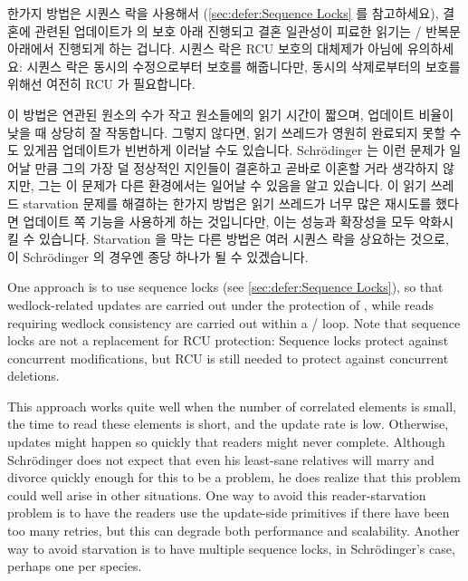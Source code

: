 \fi

한가지 방법은 시퀀스 락을 사용해서
(\cref{sec:defer:Sequence Locks} 를 참고하세요),
결혼에 관련된 업데이트가  의 보호 아래 진행되고 결혼
일관성이 피료한 읽기는  /  반복문
아래에서 진행되게 하는 겁니다.
시퀀스 락은 RCU 보호의 대체제가 아님에 유의하세요:
시퀀스 락은 동시의 수정으로부터 보호를 해줍니다만, 동시의 삭제로부터의 보호를
위해선 여전히 RCU 가 필요합니다.

이 방법은 연관된 원소의 수가 작고 원소들에의 읽기 시간이 짧으며, 업데이트
비율이 낮을 때 상당히 잘 작동합니다.
그렇지 않다면, 읽기 쓰레드가 영원히 완료되지 못할 수도 있게끔 업데이트가
빈번하게 이러날 수도 있습니다.
Schr\"odinger 는 이런 문제가 일어날 만큼 그의 가장 덜 정상적인 지인들이
결혼하고 곧바로 이혼할 거라 생각하지 않지만, 그는 이 문제가 다른 환경에서는
일어날 수 있음을 알고 있습니다.
이 읽기 쓰레드 starvation 문제를 해결하는 한가지 방법은 읽기 쓰레드가 너무 많은
재시도를 했다면 업데이트 쪽 기능을 사용하게 하는 것입니다만, 이는 성능과
확장성을 모두 악화시킬 수 있습니다.
Starvation 을 막는 다른 방법은 여러 시퀀스 락을 상요하는 것으로, 이
Schr\"odinger 의 경우엔 종당 하나가 될 수 있겠습니다.

\iffalse

One approach is to use sequence locks
(see \cref{sec:defer:Sequence Locks}),
so that wedlock-related updates are carried out under the
protection of , while reads requiring
wedlock consistency are carried out within
a  /  loop.
Note that sequence locks are not a replacement for RCU protection:
Sequence locks protect against concurrent modifications, but RCU
is still needed to protect against concurrent deletions.

This approach works quite well when the number of correlated elements is
small, the time to read these elements is short, and the update rate is
low.
Otherwise, updates might happen so quickly that readers might never complete.
Although Schr\"odinger does not expect that even his least-sane relatives
will marry and divorce quickly enough for this to be a problem,
he does realize that this problem could well arise in other situations.
One way to avoid this reader-starvation problem is to have the readers
use the update-side primitives if there have been too many retries,
but this can degrade both performance and scalability.
Another way to avoid starvation is to have multiple sequence locks,
in Schr\"odinger's case, perhaps one per species.

